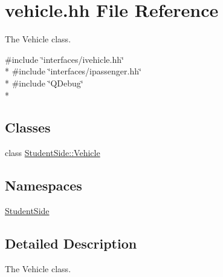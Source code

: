 \hypertarget{vehicle_8hh}{\section{vehicle.\-hh File Reference}
\label{vehicle_8hh}
}


The Vehicle class.  


{\ttfamily \#include \char`\"{}interfaces/ivehicle.\-hh\char`\"{}}\\*
{\ttfamily \#include \char`\"{}interfaces/ipassenger.\-hh\char`\"{}}\\*
{\ttfamily \#include \char`\"{}Q\-Debug\char`\"{}}\\*
\subsection*{Classes}
\begin{DoxyCompactItemize}
\item 
class \hyperlink{class_student_side_1_1_vehicle}{Student\-Side\-::\-Vehicle}
\end{DoxyCompactItemize}
\subsection*{Namespaces}
\begin{DoxyCompactItemize}
\item 
\hyperlink{namespace_student_side}{Student\-Side}
\end{DoxyCompactItemize}


\subsection{Detailed Description}
The Vehicle class. 